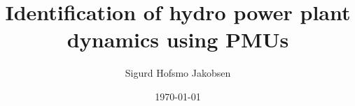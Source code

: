 \title{Identification of hydro power plant dynamics using PMUs}
\author{Sigurd Hofsmo Jakobsen}
\date{\today}

\begin{frame}
  \titlepage
\end{frame}
